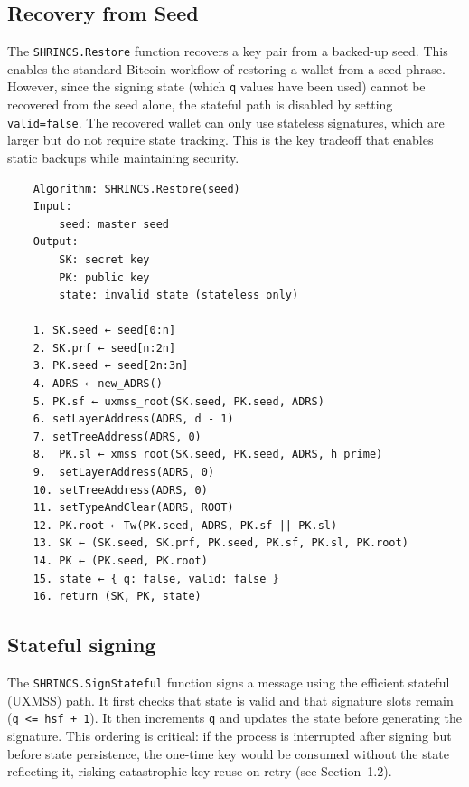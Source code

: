 \subsection{Recovery from Seed}
The \texttt{SHRINCS.Restore} function recovers a key pair from a backed-up seed. This enables the standard Bitcoin workflow of restoring a wallet from a seed phrase. However, since the signing state (which \texttt{q} values have been used) cannot be recovered from the seed alone, the stateful path is disabled by setting \texttt{valid=false}. The recovered wallet can only use stateless signatures, which are larger but do not require state tracking. This is the key tradeoff that enables static backups while maintaining security.
\begin{verbatim}
    Algorithm: SHRINCS.Restore(seed)
    Input:
        seed: master seed
    Output:
        SK: secret key
        PK: public key
        state: invalid state (stateless only)

    1. SK.seed ← seed[0:n]
    2. SK.prf ← seed[n:2n]
    3. PK.seed ← seed[2n:3n]
    4. ADRS ← new_ADRS()
    5. PK.sf ← uxmss_root(SK.seed, PK.seed, ADRS)
    6. setLayerAddress(ADRS, d - 1)
    7. setTreeAddress(ADRS, 0)
    8.  PK.sl ← xmss_root(SK.seed, PK.seed, ADRS, h_prime)
    9.  setLayerAddress(ADRS, 0)
    10. setTreeAddress(ADRS, 0)
    11. setTypeAndClear(ADRS, ROOT)
    12. PK.root ← Tw(PK.seed, ADRS, PK.sf || PK.sl)
    13. SK ← (SK.seed, SK.prf, PK.seed, PK.sf, PK.sl, PK.root)
    14. PK ← (PK.seed, PK.root)
    15. state ← { q: false, valid: false }
    16. return (SK, PK, state)
\end{verbatim}

\subsection{Stateful signing}
The \texttt{SHRINCS.SignStateful} function signs a message using the efficient stateful (UXMSS) path. It first checks that state is valid and that signature slots remain (\texttt{q <= hsf + 1}). It then increments \texttt{q} and updates the state before generating the signature. This ordering is critical: if the process is interrupted after signing but before state persistence, the one-time key would be consumed without the state reflecting it, risking catastrophic key reuse on retry (see Section~1.2).

